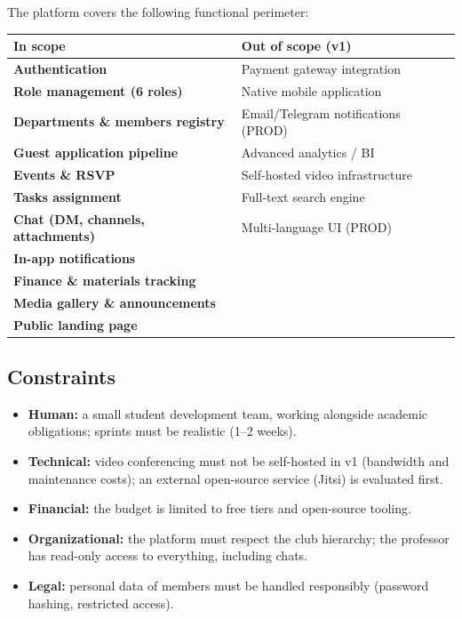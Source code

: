 \documentclass[12pt,a4paper]{report}
\begin{document}
The platform covers the following functional perimeter:

\begin{center}
\begin{tabular}{>{\bfseries}p{3.5cm} p{9.5cm}}
\toprule
\textbf{In scope} & \textbf{Out of scope (v1)} \\
\midrule
Authentication & Payment gateway integration \\
Role management (6 roles) & Native mobile application \\
Departments \& members registry & Email/Telegram notifications (PROD) \\
Guest application pipeline & Advanced analytics / BI \\
Events \& RSVP & Self-hosted video infrastructure \\
Tasks assignment & Full-text search engine \\
Chat (DM, channels, attachments) & Multi-language UI (PROD) \\
In-app notifications & \\
Finance \& materials tracking & \\
Media gallery \& announcements & \\
Public landing page & \\
\bottomrule
\end{tabular}
\end{center}

\subsection{Constraints}

\begin{itemize}[leftmargin=*]
    \item \textbf{Human:} a small student development team, working alongside academic
          obligations; sprints must be realistic (1--2 weeks).
    \item \textbf{Technical:} video conferencing must not be self-hosted in v1 (bandwidth
          and maintenance costs); an external open-source service (Jitsi) is evaluated
          first.
    \item \textbf{Financial:} the budget is limited to free tiers and open-source
          tooling.
    \item \textbf{Organizational:} the platform must respect the club hierarchy; the
          professor has read-only access to everything, including chats.
    \item \textbf{Legal:} personal data of members must be handled responsibly
          (password hashing, restricted access).
\end{itemize}
\end{document}
